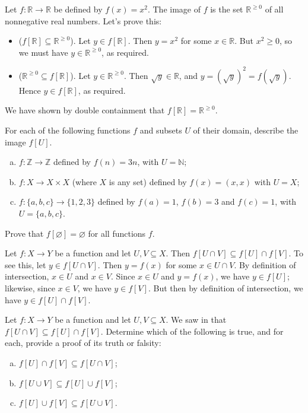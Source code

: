 \begin{example}
Let $f : \mathbb{R} \to \mathbb{R}$ be defined by $f(x)=x^2$. The image of $f$ is the set $\mathbb{R}^{\ge 0}$ of all nonnegative real numbers. Let's prove this:
\begin{itemize}
\item ($f[\mathbb{R}] \subseteq \mathbb{R}^{\ge 0}$). Let $y \in f[\mathbb{R}]$. Then $y=x^2$ for some $x \in \mathbb{R}$. But $x^2 \ge 0$, so we must have $y \in \mathbb{R}^{\ge 0}$, as required.
\item ($\mathbb{R}^{\ge 0} \subseteq f[\mathbb{R}]$). Let $y \in \mathbb{R}^{\ge 0}$. Then $\sqrt{y} \in \mathbb{R}$, and $y = (\sqrt{y})^2 = f(\sqrt{y})$. Hence $y \in f[\mathbb{R}]$, as required.
\end{itemize}
We have shown by double containment that $f[\mathbb{R}] = \mathbb{R}^{\ge 0}$.
\end{example}

\begin{exercise}
For each of the following functions $f$ and subsets $U$ of their domain, describe the image $f[U]$.
\begin{enumerate}[(a)]
\item $f : \mathbb{Z} \to \mathbb{Z}$ defined by $f(n)=3n$, with $U = \mathbb{N}$;
\item $f : X \to X \times X$ (where $X$ is any set) defined by $f(x)=(x,x)$ with $U=X$;
\item $f : \{ a, b, c \} \to \{ 1, 2, 3 \}$ defined by $f(a)=1$, $f(b)=3$ and $f(c)=1$, with $U=\{a,b,c\}$.
\end{enumerate}
\end{exercise}

\begin{exercise}
Prove that $f[\varnothing] = \varnothing$ for all functions $f$.
\end{exercise}

\begin{example}
\label{exImageOfIntersectionSubsetIntersectionOfImage}
Let $f : X \to Y$ be a function and let $U, V \subseteq X$. Then $f[U \cap V] \subseteq f[U] \cap f[V]$. To see this, let $y \in f[U \cap V]$. Then $y = f(x)$ for some $x \in U \cap V$. By definition of intersection, $x \in U$ and $x \in V$. Since $x \in U$ and $y=f(x)$, we have $y \in f[U]$; likewise, since $x \in V$, we have $y \in f[V]$. But then by definition of intersection, we have $y \in f[U] \cap f[V]$.
\end{example}

\begin{exercise}
Let $f : X \to Y$ be a function and let $U, V \subseteq X$. We saw in  that $f[U \cap V] \subseteq f[U] \cap f[V]$. Determine which of the following is true, and for each, provide a proof of its truth or falsity:
\begin{enumerate}[(a)]
\item $f[U] \cap f[V] \subseteq f[U \cap V]$;
\item $f[U \cup V] \subseteq f[U] \cup f[V]$;
\item $f[U] \cup f[V] \subseteq f[U \cup V]$.
\end{enumerate}
\end{exercise}

